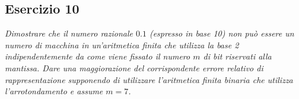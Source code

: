 \subsection{Esercizio 10}
\emph{Dimostrare che il numero razionale $ 0.1$  (espresso in base 10) non può essere un numero di macchina in un'aritmetica finita che utilizza la base 2 indipendentemente da come viene fissato il numero $\mathit{m}$ di bit riservati alla mantissa. Dare una maggiorazione del corrispondente errore relativo di rappresentazione supponendo di utilizzare l'aritmetica finita binaria che utilizza l'arrotondamento e assume $ \mathit{m} = 7$.}

